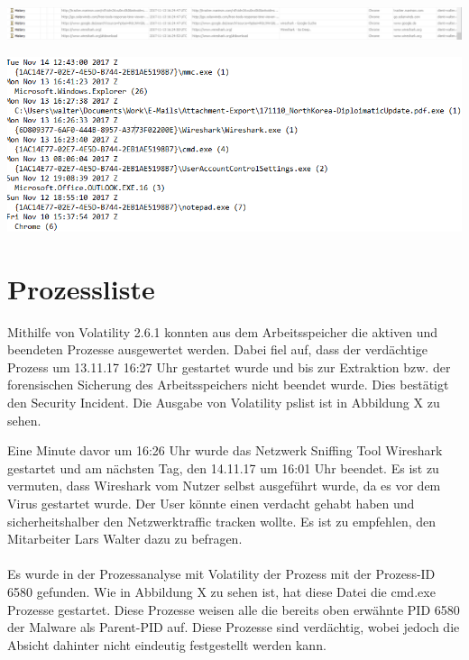 \begin{center}
	\includegraphics[width=15.8cm]{figures/wireshark_history.PNG}
	\label{fig:wireshark_history}
\end{center}

\begin{center}
	\includegraphics[width=15.8cm]{figures/wireshark_paths.png}
	\label{fig:wireshark_paths}
\end{center}

\section{Prozessliste}
Mithilfe von Volatility 2.6.1 konnten aus dem Arbeitsspeicher die aktiven und beendeten Prozesse ausgewertet werden. Dabei fiel auf, dass der verdächtige Prozess  um 13.11.17 16:27 Uhr gestartet wurde und bis zur Extraktion bzw. der forensischen Sicherung des Arbeitsspeichers nicht beendet wurde. Dies bestätigt den Security Incident. Die Ausgabe von Volatility pslist ist in Abbildung X zu sehen.

Eine Minute davor um 16:26 Uhr wurde das Netzwerk Sniffing Tool Wireshark gestartet und am nächsten Tag, den 14.11.17 um 16:01 Uhr beendet. Es ist zu vermuten, dass Wireshark vom Nutzer selbst ausgeführt wurde, da es vor dem Virus gestartet wurde. Der User könnte einen verdacht gehabt haben und sicherheitshalber den Netzwerktraffic tracken wollte. Es ist zu empfehlen, den Mitarbeiter Lars Walter dazu zu befragen.
\\
\\
Es wurde in der Prozessanalyse mit Volatility der Prozess  mit der Prozess-ID 6580 gefunden. Wie in Abbildung X zu sehen ist, hat diese Datei die cmd.exe Prozesse gestartet. Diese Prozesse weisen alle die bereits oben erwähnte PID 6580 der Malware als Parent-PID auf. Diese Prozesse sind verdächtig, wobei jedoch die Absicht dahinter nicht eindeutig festgestellt werden kann.

